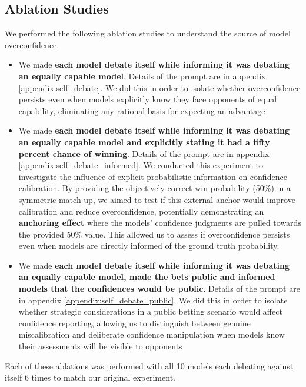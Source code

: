 \documentclass{article}
\begin{document}
\subsection{Ablation Studies}
\label{subsec:ablation_studies}

We performed the following ablation studies to understand the source of model overconfidence.

\begin{itemize}
  \item We made \textbf{each model debate itself while informing it was debating an equally capable model}. Details of the prompt are in appendix \ref{appendix:self_debate}. We did this in order to isolate whether overconfidence persists even when models explicitly know they face opponents of equal capability, eliminating any rational basis for expecting an advantage
  \item We made \textbf{each model debate itself while informing it was debating an equally capable model and explicitly stating it had a fifty percent chance of winning}. Details of the prompt are in appendix \ref{appendix:self_debate_informed}. We conducted this experiment to investigate the influence of explicit probabilistic information on confidence calibration. By providing the objectively correct win probability (50\%) in a symmetric match-up, we aimed to test if this external anchor would improve calibration and reduce overconfidence, potentially demonstrating an \textbf{anchoring effect} where the models' confidence judgments are pulled towards the provided 50\% value. This allowed us to assess if overconfidence persists even when models are directly informed of the ground truth probability.

  \item We made \textbf{each model debate itself while informing it was debating an equally capable model, made the bets public and informed models that the confidences would be public}. Details of the prompt are in appendix \ref{appendix:self_debate_public}. We did this in order to isolate whether strategic considerations in a public betting scenario would affect confidence reporting, allowing us to distinguish between genuine miscalibration and deliberate confidence manipulation when models know their assessments will be visible to opponents
\end{itemize}

Each of these ablations was performed with all 10 models each debating against itself 6 times to match our original experiment.
\end{document}
